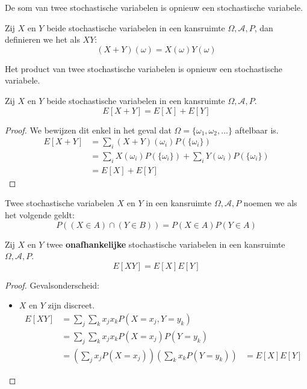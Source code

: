 \documentclass[main.tex]{subfiles}
\begin{document}
\begin{st}
  De som van twee stochastische variabelen is opnieuw een stochastische variabele.
\end{st}

\begin{de}
  Zij $X$ en $Y$ beide stochastische variabelen in een kansruimte $\Omega,\mathcal{A},P$, dan definieren we het  als $XY$:
  \[ (X+Y)(\omega) = X(\omega)Y(\omega) \]
\end{de}

\begin{st}
  Het product van twee stochastische variabelen is opnieuw een stochastische variabele.
\end{st}

\begin{ei}
  Zij $X$ en $Y$ beide stochastische variabelen in een kansruimte $\Omega,\mathcal{A},P$.
  \[ E[X+Y] = E[X] + E[Y] \]

  \begin{proof}
    We bewijzen dit enkel in het geval dat $\Omega = \{\omega_{1},\omega_{2},\dotsc\}$ aftelbaar is.
    \begin{align*}
      E[X+Y]
      &= \sum_{i}(X+Y)(\omega_{i})P(\{\omega_{i}\})\\
      &= \sum_{i}X(\omega_{i})P(\{\omega_{i}\}) + \sum_{i}Y(\omega_{i})P(\{\omega_{i}\})\\
      &= E[X] + E[Y]
    \end{align*}
  \end{proof}
\end{ei}

\begin{de}
  Twee stochastische variabelen $X$ en $Y$ in een kansruimte $\Omega,\mathcal{A},P$ noemen we  als het volgende geldt:
  \[ P((X\in A)\cap (Y\in B)) = P(X\in A)P(Y\in A) \]
\end{de}

\begin{ei}
  Zij $X$ en $Y$ twee \textbf{onafhankelijke} stochastische variabelen in een kansruimte $\Omega,\mathcal{A},P$.
  \[ E[XY] = E[X] E[Y] \]

  \begin{proof}
    Gevalsonderscheid:
    \begin{itemize}
    \item $X$ en $Y$ zijn discreet.
      \begin{align*}
        E[XY]
        &= \sum_{j}\sum_{k}x_{j}x_{k}P(X=x_{j},Y=y_{k})\\
        &= \sum_{j}\sum_{k}x_{j}x_{k}P(X=x_{j})P(Y=y_{k})\\
        &= \left( \sum_{j}x_{j}P(X=x_{j}) \right)\left( \sum_{k}x_{k}P(Y=y_{k}) \right)
        &= E[X]E[Y]
      \end{align*}
    \end{itemize}
  \end{proof}
\end{ei}
\end{document}

